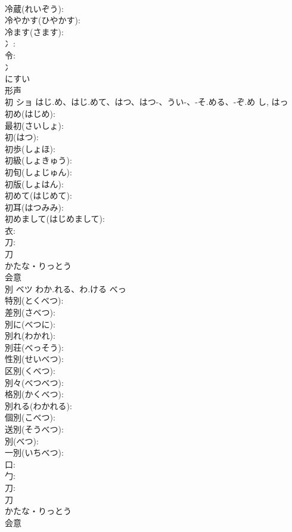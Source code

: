 \documentclass[8pt]{extreport}
\begin{document}
\begin{CJK}{UTF8}{min}
\\	冷蔵(れいぞう): 
\\	冷やかす(ひやかす): 
\\	冷ます(さます): 
\\	冫: 
\\	令: 
\\	冫	
\\	にすい	
\\	形声 
\\	初	ショ	はじ.め、はじ.めて、はつ、はつ-、うい-、-そ.める、-ぞ.め	し, はっ	
\\	初め(はじめ): 
\\	最初(さいしょ): 
\\	初(はつ): 
\\	初歩(しょほ): 
\\	初級(しょきゅう): 
\\	初旬(しょじゅん): 
\\	初版(しょはん): 
\\	初めて(はじめて): 
\\	初耳(はつみみ): 
\\	初めまして(はじめまして): 
\\	衣: 
\\	刀: 
\\	刀	
\\	かたな・りっとう	
\\	会意 
\\	別	ベツ	わか.れる、わ.ける	べっ	
\\	特別(とくべつ): 
\\	差別(さべつ): 
\\	別に(べつに): 
\\	別れ(わかれ): 
\\	別荘(べっそう): 
\\	性別(せいべつ): 
\\	区別(くべつ): 
\\	別々(べつべつ): 
\\	格別(かくべつ): 
\\	別れる(わかれる): 
\\	個別(こべつ): 
\\	送別(そうべつ): 
\\	別(べつ): 
\\	一別(いちべつ): 
\\	口: 
\\	勹: 
\\	刀: 
\\	刀	
\\	かたな・りっとう	
\\	会意 

\end{CJK}
\end{document}
